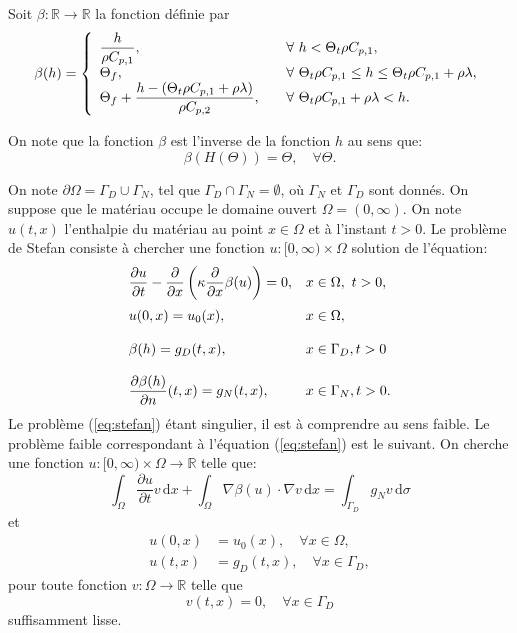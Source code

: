 Soit $\beta:\mathbb R\to\mathbb R$ la fonction d\'efinie par
\begin{equation*}
  \beta(h) = \left\{
  \begin{array}{ll}
    \displaystyle\frac{h}{\rho C_{p,1}},& \quad \forall\ h < \Theta_t \rho C_{p,1},\\
    \Theta_f,& \quad \forall\ \Theta_t \rho C_{p,1} \leq h \leq \Theta_t \rho C_{p,1} + \rho\lambda,\\
    \Theta_f + \displaystyle\frac{h - \left( \Theta_t \rho C_{p,1} + \rho\lambda \right)}{\rho
      C_{p,2}},& \quad \forall\ \Theta_t \rho C_{p,1} + \rho\lambda < h.
  \end{array}
  \right.
\end{equation*}

On note que la fonction $\beta$ est l'inverse de la fonction $h$ au
sens que:
\begin{equation*}
  \beta(H(\Theta)) = \Theta,\quad \forall \Theta.
\end{equation*}

On note $\partial \Omega = \Gamma_D \cup \Gamma_N$, tel que
$\Gamma_D\cap \Gamma_N = \emptyset$, o\`u $\Gamma_N$ et $\Gamma_D$
sont donn\'es. On suppose que le mat\'eriau occupe le domaine ouvert
$\Omega = (0, \infty)$. On note $u(t, x)$ l'enthalpie du mat\'eriau au
point $x\in\Omega$ et \`a l'instant $t > 0$. Le probl\`eme de Stefan
consiste \`a chercher une fonction $u:[0, \infty)\times\Omega$
solution de l'\'equation:
\begin{equation}\label{eq:stefan}
  \begin{array}{ll}
    \displaystyle\frac{\partial u}{\partial t} - \displaystyle\frac{\partial }{\partial x}\left( \kappa \displaystyle\frac{\partial}{\partial x} \beta(u) \right) = 0,& x\in\Omega,\ t > 0,\\[\normalbaselineskip]
    u(0, x) = u_0(x),& x\in \Omega,\\[\normalbaselineskip]
    \beta(h) = g_D(t, x),& x \in\Gamma_D, t > 0\\[\normalbaselineskip]
    \displaystyle\frac{\partial \beta(h)}{\partial n}(t, x) = g_N(t, x),& x \in\Gamma_N, t > 0.
  \end{array}
\end{equation}
Le probl\`eme (\ref{eq:stefan}) \'etant singulier, il est \`a comprendre
au sens faible. Le probl\`eme faible correspondant \`a l'\'equation
(\ref{eq:stefan}) est le suivant. On cherche une fonction $u:[0,
  \infty)\times\Omega\to\mathbb R$ telle que:
\begin{equation}\label{eq:stefan-weak}
  \int_\Omega \frac{\partial u}{\partial t} v\,\mathrm dx +
  \int_\Omega \nabla \beta(u) \cdot \nabla v\,\mathrm dx = \int_{\Gamma_D} g_N v\, \mathrm d\sigma
\end{equation}
et
\begin{align*}
  u(0, x) &= u_0(x), \quad \forall x \in \Omega,\\
  u(t, x) &= g_D(t, x), \quad \forall x \in \Gamma_D,
\end{align*}
pour toute fonction $v:\Omega\to\mathbb R$ telle que
\begin{equation*}
  v(t, x) = 0, \quad \forall x \in \Gamma_D
\end{equation*}
suffisamment lisse.

